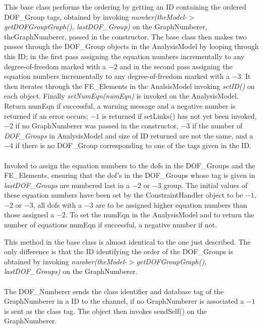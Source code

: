 This base class performs the ordering by getting an ID containing the
ordered DOF\_Group tags, obtained by invoking {\em
number(theModel-$>$getDOFGroupGraph(), lastDOF\_Group)} on the
GraphNumberer, \p theGraphNumberer, passed in the constructor. The
base class then makes two passes through the DOF\_Group objects in the
AnalysisModel by looping through this ID; in the first pass assigning the
equation numbers incrementally to any degree-of-freedom marked with a
$-2$ and in the second pass assigning the equation numbers
incrementally to any degree-of-freedom marked with a $-3$. It then
iterates through the FE\_Elements in the AnalsisModel invoking {\em
setID()} on each object. Finally {\em setNumEqn(numEqn)} is invoked on
the AnalysisModel. Return \p numEqn if successful, a warning
message and a negative number is returned if an error occurs; $-1$ is
returned if setLinks() has not yet been invoked, $-2$ if no
GraphNumberer was passed in the constructor, $-3$ if the
number of {\em DOF\_Groups} in AnalysisModel and size of ID returned
are not the same, and a $-4$ if there is no DOF\_Group corresponding
to one of the tags given in the ID.\\



 \\
Invoked to assign the equation numbers to the dofs in the DOF\_Groups
and the FE\_Elements, ensuring that the dof's in the DOF\_Groups whose
tag is given in {\em lastDOF\_Groups} are numbered last in a $-2$ or
$-3$ group. The initial values of these equation numbers have been set
by the ConstraintHandler object to be $-1$, $-2$ or $-3$, all dofs
with a $-3$ are to be assigned higher equation numbers than those
assigned a $-2$. To set the \p numEqn in the AnalysisModel and to
return the number of equations \p numEqn if successful, a negative
number if not.  

This method in the base class is almost identical to the one just
described. The only difference is that the ID identifying the order of
the DOF\_Groups is obtained by invoking {\em
number(theModel-$>$getDOFGroupGraph(), lastDOF\_Groups)} on the
GraphNumberer. \\



\\ 
The DOF\_Numberer sends the class identifier and database tag of the
GraphNumberer in a ID to the channel, if no GraphNumberer is
associated a $-1$ is sent as the class tag. The object then invokes
sendSelf() on the GraphNumberer. \\ 

